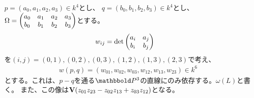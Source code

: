\begin{framed}
  $p=(a_0,a_1,a_2,a_3) \in k^4$とし、
  $q=(b_0,b_1,b_2,b_3) \in k^4$とし、
  $\Omega = \left(\begin{matrix} a_0 & a_1 & a_2 & a_3 \\ b_0 & b_1 & b_2 & b_3 \end{matrix}\right)$とする。
  \begin{align}
    w_{ij} &= \det \left(\begin{matrix} a_i & a_j \\ b_i & b_j \end{matrix}\right)
  \end{align}
  を$(i,j)=(0,1),(0,2),(0,3),(1,2),(1,3),(2,3)$で考え、
  \begin{align}
    w(p,q) = (w_{01},w_{02},w_{03},w_{12},w_{13},w_{23}) \in k^6
  \end{align}
  とする。これは、$p-q$を通る$\P^3$の直線にのみ依存する。$\omega(L)$と書く。
  また、この像は$\textbf V(z_{01}z_{23}-z_{02}z_{13}+z_{03}z_{12})$となる。
\end{framed}

